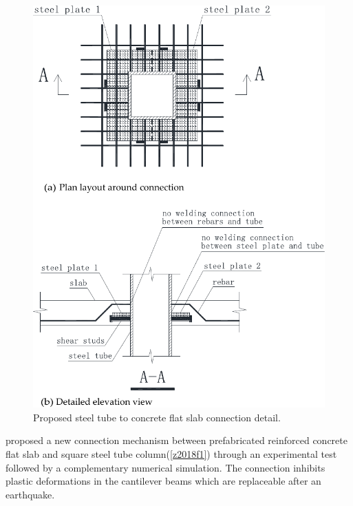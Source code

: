 \begin{figure}\centering
    \includegraphics[width=\columnwidth]{Figures/y2020f3.pdf}
    \caption{Proposed steel tube to concrete flat slab connection detail\citep{yu2020}.}
    \label{y2020f3}
    \end{figure}
\cite{zhang2018} proposed a new connection mechanism between prefabricated reinforced concrete flat slab and square steel tube column(\ref{z2018f1}) through an experimental test followed by a complementary numerical simulation. The connection inhibits plastic deformations in the cantilever beams which are replaceable after an earthquake\citep{zhang2022}.

